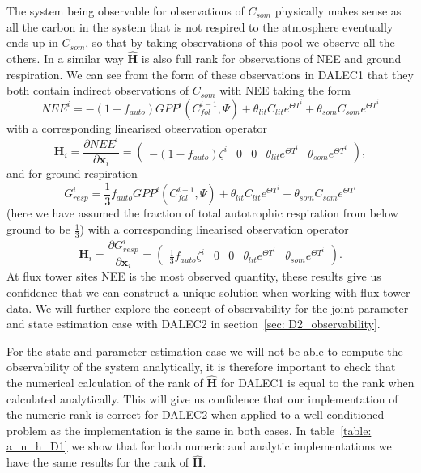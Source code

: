 \documentclass[11pt]{article}
\begin{document}
The system being observable for observations of $C_{som}$ physically makes sense as all the carbon in the system that is not respired to the atmosphere eventually ends up in $C_{som}$, so that by taking observations of this pool we observe all the others. In a similar way $\hat{\textbf{H}}$ is also full rank for observations of NEE and ground respiration. We can see from the form of these observations in DALEC1 that they both contain indirect observations of $C_{som}$ with NEE taking the form
\begin{equation}
NEE^{i}=-(1-f_{auto})GPP^{i}(C_{fol}^{i-1}, \Psi) + \theta_{lit}C_{lit} e^{\Theta T^{i}} + \theta_{som}C_{som} e^{\Theta T^{i}} \label{eqn: D1_nee}
\end{equation}
with a corresponding linearised observation operator
\begin{equation}
\textbf{H}_{i} = \frac{\partial NEE^{i}}{\partial \textbf{x}_{i}} =
\begin{pmatrix}
-(1-f_{auto})\zeta^i & 0 & 0 & \theta_{lit} e^{\Theta T^{i}} & \theta_{som} e^{\Theta T^{i}}
\end{pmatrix},
\end{equation}
and for ground respiration
\begin{equation}
G_{resp}^{i}=\frac{1}{3}f_{auto}GPP^{i}(C_{fol}^{i-1}, \Psi) + \theta_{lit}C_{lit} e^{\Theta T^{i}} + \theta_{som}C_{som} e^{\Theta T^{i}} \label{neeeqn}
\end{equation}
(here we have assumed the fraction of total autotrophic respiration from below ground to be $\frac{1}{3}$) with a corresponding linearised observation operator
\begin{equation}
\textbf{H}_{i} = \frac{\partial G_{resp}^{i}}{\partial \textbf{x}_{i}} =
\begin{pmatrix}
\frac{1}{3}f_{auto}\zeta^i & 0 & 0 & \theta_{lit} e^{\Theta T^{i}} & \theta_{som} e^{\Theta T^{i}}
\end{pmatrix}.
\end{equation}
At flux tower sites NEE is the most observed quantity, these results give us confidence that we can construct a unique solution when working with flux tower data. We will further explore the concept of observability for the joint parameter and state estimation case with DALEC2 in section~\ref{sec: D2_observability}. 

For the state and parameter estimation case we will not be able to compute the observability of the system analytically, it is therefore important to check that the numerical calculation of the rank of $\hat{\textbf{H}}$ for DALEC1 is equal to the rank when calculated analytically. This will give us confidence that our implementation of the numeric rank is correct for DALEC2 when applied to a well-conditioned problem as the implementation is the same in both cases. In table~\ref{table: a_n_h_D1} we show that for both numeric and analytic implementations we have the same results for the rank of $\hat{\textbf{H}}$.
\end{document}
